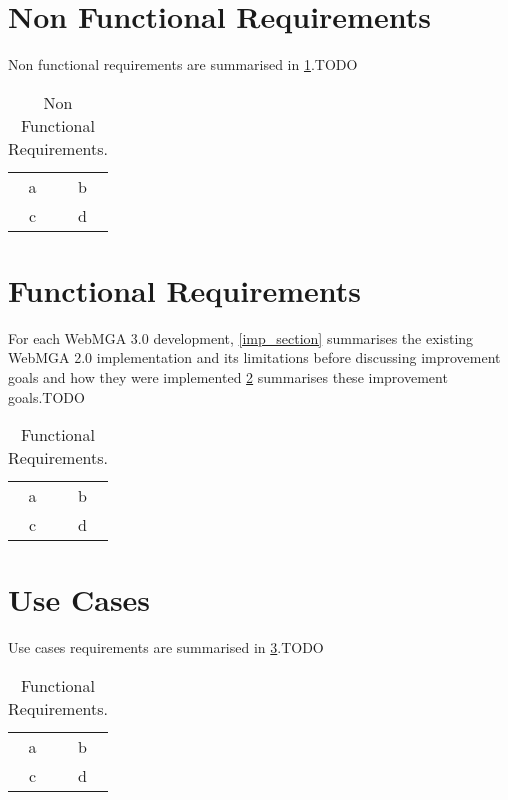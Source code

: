 \section{Non Functional Requirements}
Non functional requirements are summarised in \cref{tab:func}.TODO
\begin{table}
  \begin{center}
    \begin{tabular}{cc}
       a & b \\
       c & d \\
    \end{tabular}
  \end{center}
  \caption{Non Functional Requirements.}
  \label{tab:func}
\end{table}

\section{Functional Requirements}
For each WebMGA 3.0 development, \cref{imp_section} summarises the existing WebMGA 2.0 implementation and its limitations before discussing improvement goals and how they were implemented \cref{tab:non_func} summarises these improvement goals.TODO
\begin{table}
  \begin{center}
    \begin{tabular}{cc}
       a & b \\
       c & d \\
    \end{tabular}
  \end{center}
  \caption{Functional Requirements.}
  \label{tab:non_func}
\end{table}

\section{Use Cases}
Use cases requirements are summarised in \cref{tab:use_cases}.TODO
\begin{table}
  \begin{center}
    \begin{tabular}{cc}
       a & b \\
       c & d \\
    \end{tabular}
  \end{center}
  \caption{Functional Requirements.}
  \label{tab:use_cases}
\end{table}
